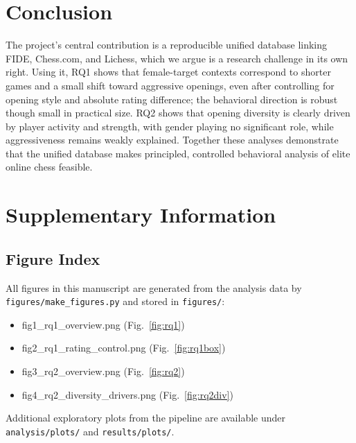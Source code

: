 \documentclass[11pt,a4paper]{article}
\begin{document}
\section{Conclusion}
The project's central contribution is a reproducible unified database linking FIDE,
Chess.com, and Lichess, which we argue is a research challenge in its own right. Using it, RQ1
shows that female-target contexts correspond to shorter games and a small shift toward
aggressive openings, even after controlling for opening style and absolute rating difference;
the behavioral direction is robust though small in practical size. RQ2 shows that opening
diversity is clearly driven by player activity and strength, with gender playing no
significant role, while aggressiveness remains weakly explained. Together these analyses
demonstrate that the unified database makes principled, controlled behavioral analysis of
elite online chess feasible.

\section*{Supplementary Information}
\subsection*{Figure Index}
All figures in this manuscript are generated from the analysis data by
\texttt{figures/make\_figures.py} and stored in \texttt{figures/}:
{\footnotesize\ttfamily
\begin{itemize}\setlength\itemsep{0pt}
  \item fig1\_rq1\_overview.png \quad(Fig.~\ref{fig:rq1})
  \item fig2\_rq1\_rating\_control.png \quad(Fig.~\ref{fig:rq1box})
  \item fig3\_rq2\_overview.png \quad(Fig.~\ref{fig:rq2})
  \item fig4\_rq2\_diversity\_drivers.png \quad(Fig.~\ref{fig:rq2div})
\end{itemize}}
Additional exploratory plots from the pipeline are available under
\texttt{analysis/plots/} and \texttt{results/plots/}.
\end{document}
